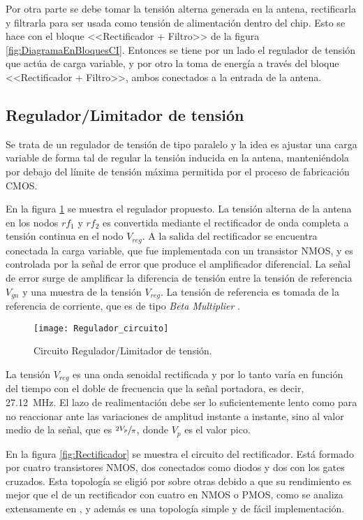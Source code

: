 Por otra parte se debe tomar la tensión alterna generada en la antena, 
rectificarla y filtrarla para ser usada como tensión de alimentación 
dentro del chip. Esto se hace con el bloque <<Rectificador + Filtro>> 
de la figura \ref{fig:DiagramaEnBloquesCI}. Entonces se tiene por un 
lado el regulador de tensión que actúa de carga variable, y por otro la
toma de energía a través del bloque <<Rectificador + Filtro>>, ambos 
conectados a la entrada de la antena.

\subsection{Regulador/Limitador de tensión}

Se trata de un regulador de tensión de tipo paralelo y la idea es 
ajustar una carga variable de forma tal de regular la tensión 
inducida en la antena, manteniéndola por debajo del límite de 
tensión máxima permitida por el proceso de fabricación CMOS.

En la figura \ref{fig:ReguladorCircuito} se muestra el regulador 
propuesto. La tensión alterna de la antena en los nodos \(rf_{1}\) y 
\(rf_{2}\) es convertida mediante el rectificador de onda completa a 
tensión continua en el nodo \(V_{reg}\). A la salida del 
rectificador se encuentra conectada la carga variable, que fue 
implementada con un transistor NMOS, y es controlada por la señal de 
error que produce el amplificador diferencial. La señal de error 
surge de amplificar la diferencia de tensión entre la tensión de 
referencia \( V_{gn}\) y una muestra de la tensión \(V_{reg}\). La 
tensión de referencia es tomada de la referencia de corriente, que 
es de tipo \emph{Beta Multiplier} \cite{Baker}.

\begin{figure}
	\centering
	\texttt{[image: Regulador\_circuito]}
	\caption{Circuito Regulador/Limitador de tensión.}
	\label{fig:ReguladorCircuito}
\end{figure}

La tensión \(V_{reg}\) es una onda senoidal rectificada y por lo tanto 
varía en función del tiempo con el doble de frecuencia que la señal 
portadora, es decir, \SI{27.12}{\mega\hertz}. El lazo de 
realimentación debe ser lo suficientemente lento como para no reaccionar 
ante las variaciones de amplitud instante a instante, sino al valor 
medio de la señal, que es \(\sfrac{2 V_{p}}{\pi}\), donde 
\(V_{p}\) es el valor pico. 

En la figura \ref{fig:Rectificador} se muestra el circuito del 
rectificador. Está formado por cuatro transistores NMOS, dos 
conectados como diodos y dos con los gates cruzados. Esta topología se 
eligió por sobre otras debido a que su rendimiento es mejor que el de 
un rectificador con cuatro en NMOS o PMOS, como se analiza extensamente en 
\cite{RectifierComparison}, y además es una topología simple y de 
fácil implementación. 

